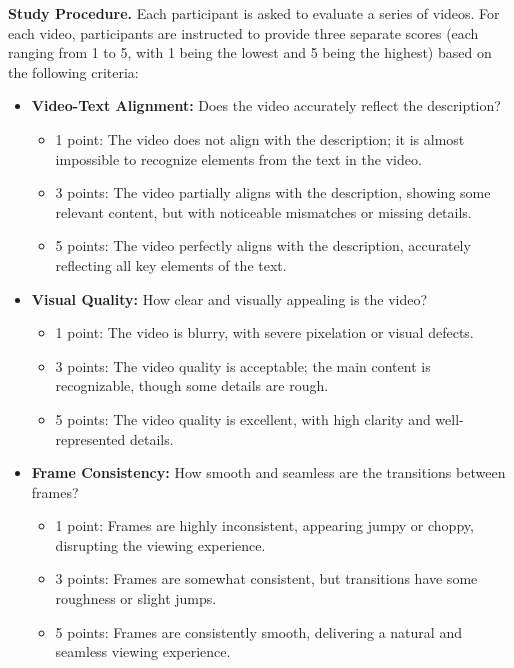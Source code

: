 \vspace{0.1cm}
\noindent\textbf{Study Procedure.} Each participant is asked to evaluate a series of videos. For each video, participants are instructed to provide three separate scores (each ranging from 1 to 5, with 1 being the lowest and 5 being the highest) based on the following criteria:

\begin{itemize}
    \item \textbf{Video-Text Alignment:} Does the video accurately reflect the description?
    \begin{itemize}
        \item  1 point: The video does not align with the description; it is almost impossible to recognize elements from the text in the video.
        \item  3 points: The video partially aligns with the description, showing some relevant content, but with noticeable mismatches or missing details.
        \item  5 points: The video perfectly aligns with the description, accurately reflecting all key elements of the text.
    \end{itemize}

    \item \textbf{Visual Quality:} How clear and visually appealing is the video?
    \begin{itemize}
        \item  1 point: The video is blurry, with severe pixelation or visual defects.
        \item  3 points: The video quality is acceptable; the main content is recognizable, though some details are rough.
        \item  5 points: The video quality is excellent, with high clarity and well-represented details.
    \end{itemize}

    \item \textbf{Frame Consistency:} How smooth and seamless are the transitions between frames?
    \begin{itemize}
        \item  1 point: Frames are highly inconsistent, appearing jumpy or choppy, disrupting the viewing experience.
        \item  3 points: Frames are somewhat consistent, but transitions have some roughness or slight jumps.
        \item  5 points: Frames are consistently smooth, delivering a natural and seamless viewing experience.
    \end{itemize}
\end{itemize}

